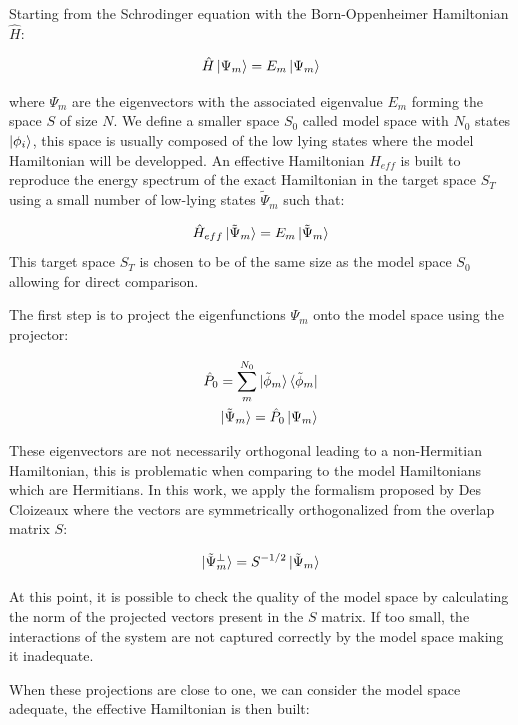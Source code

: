 \documentclass[12pt]{report}
\numberwithin{equation}{section}
\begin{document}
Starting from the Schrodinger equation with the Born-Oppenheimer Hamiltonian $\hat{H}$:

\begin{equation}
    \hat{H}\ket{\Psi_m}=E_m\ket{\Psi_m}
\end{equation}

where $\Psi_m$ are the eigenvectors with the associated eigenvalue $E_m$ forming the space $S$ of size $N$. 
We define a smaller space $S_0$ called model space with $N_0$ states $\ket{\phi_i}$, this space is usually composed of the low lying states where the model Hamiltonian will be developped.
An effective Hamiltonian $H_{eff}$  is built to reproduce the energy spectrum of the exact Hamiltonian in the target space $S_T$ using a small number of low-lying states $\tilde{\Psi}_m$ such that:

\begin{equation}
    \hat{H}_{eff}\ket{\tilde{\Psi}_m}=E_m \ket{\tilde{\Psi}_m}
\end{equation}
This target space $S_T$ is chosen to be of the same size as the model space $S_0$ allowing for direct comparison.

The first step is to project the eigenfunctions $\Psi_m$ onto the model space using the projector:

\begin{align}
    \hat{P}_0=\sum_{m}^{N_0} \ket{\tilde{\phi}_m} \bra{\tilde{\phi}_m}\\
    \ket{\tilde{\Psi}_m}=\hat{P}_0 \ket{\Psi_m}
\end{align}

These eigenvectors are not necessarily orthogonal leading to a non-Hermitian Hamiltonian, this is problematic when comparing to the model Hamiltonians which are Hermitians.
In this work, we apply the formalism proposed by Des Cloizeaux where the vectors are symmetrically orthogonalized from the overlap matrix $S$:

\begin{equation}
    \ket{\tilde{\Psi}_m^\bot}=S^{-1/2} \ket{\tilde{\Psi}_m}
\end{equation}

At this point, it is possible to check the quality of the model space by calculating the norm of the projected vectors present in the $S$ matrix.
If too small, the interactions of the system are not captured correctly by the model space making it inadequate. 
\par When these projections are close to one, we can consider the model space adequate, the effective Hamiltonian is then built:
\end{document}
